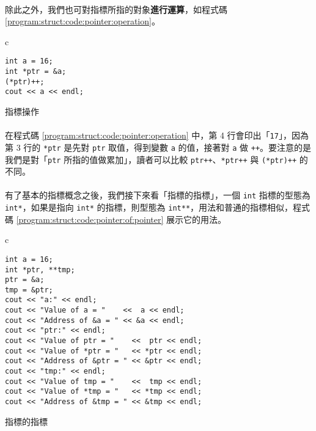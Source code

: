 \documentclass[12pt,a4paper,oneside]{article}
\begin{document}
\begin{CJK}{UTF8}{bkai}
\paragraph{}除此之外，我們也可對指標所指的對象\textbf{進行運算}，如程式碼 \ref{program:struct:code:pointer:operation}。

\begin{code}[h!]
\centering
\begin{tabular}{c}
\begin{lstlisting}
int a = 16;
int *ptr = &a;
(*ptr)++;
cout << a << endl;
\end{lstlisting}
\end{tabular}
\caption{指標操作}
\label{program:struct:code:pointer:operation}
\end{code}

\paragraph{}在程式碼 \ref{program:struct:code:pointer:operation} 中，第 4 行會印出「\lstinline!17!」，因為第 3 行的 \lstinline!*ptr! 是先對 \lstinline!ptr! 取值，得到變數 \lstinline!a! 的值，接著對 \lstinline!a! 做 \lstinline!++!。要注意的是我們是對「\lstinline!ptr! 所指的值做累加」，讀者可以比較 \lstinline!ptr++!、\lstinline!*ptr++! 與 \lstinline!(*ptr)++! 的不同。

\paragraph{}有了基本的指標概念之後，我們接下來看「指標的指標」，一個 \lstinline!int! 指標的型態為 \lstinline!int*!，如果是指向 \lstinline!int*! 的指標，則型態為 \lstinline!int**!，用法和普通的指標相似，程式碼 \ref{program:struct:code:pointer:of:pointer} 展示它的用法。

\begin{code}[h!]
\centering
\begin{tabular}{c}
\begin{lstlisting}
int a = 16;
int *ptr, **tmp;
ptr = &a;
tmp = &ptr;
cout << "a:" << endl;
cout << "Value of a = "    <<  a << endl;
cout << "Address of &a = " << &a << endl;
cout << "ptr:" << endl;
cout << "Value of ptr = "    <<  ptr << endl;
cout << "Value of *ptr = "   << *ptr << endl;
cout << "Address of &ptr = " << &ptr << endl;
cout << "tmp:" << endl;
cout << "Value of tmp = "    <<  tmp << endl;
cout << "Value of *tmp = "   << *tmp << endl;
cout << "Address of &tmp = " << &tmp << endl;
\end{lstlisting}
\end{tabular}
\caption{指標的指標}
\label{program:struct:code:pointer:of:pointer}
\end{code}


\end{CJK}
\end{document}
